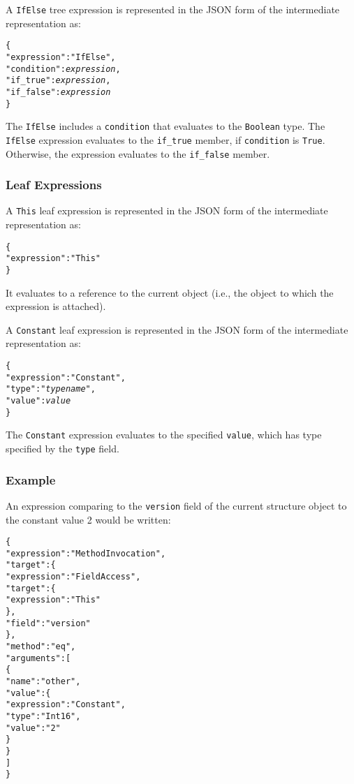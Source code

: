 \documentclass[10pt,twocolumn,a4paper]{article}
\newcommand{\code}[1]{\texttt{#1}}
\begin{document}
A \code{IfElse} tree expression is represented in the JSON form of the
intermediate representation as:
\footnotesize
\begin{alltt}
  \{
    "expression"  : "IfElse",
    "condition"   : \emph{expression},
    "if\_true"     : \emph{expression},
    "if\_false"    : \emph{expression}
  \}
\end{alltt}
\normalsize
The \code{IfElse} includes a \code{condition} that evaluates to the \code{Boolean} type.
The \code{IfElse} expression evaluates to the \code{if\_true} member, if \code{condition}
is \code{True}. Otherwise, the expression evaluates to the \code{if\_false} member.

\subsubsection{Leaf Expressions}

A \code{This} leaf expression is represented in the JSON form of the
intermediate representation as:
\footnotesize
\begin{alltt}
  \{
    "expression"   : "This"
  \}
\end{alltt}
\normalsize
It evaluates to a reference to the current object (i.e., the object to
which the expression is attached).

A \code{Constant} leaf expression is represented in the JSON form of the
intermediate representation as:
\footnotesize
\begin{alltt}
  \{
    "expression"   : "Constant",
    "type"         : "\emph{type name}",
    "value"        : \emph{value}
  \}
\end{alltt}
\normalsize
The \code{Constant} expression evaluates to the specified \code{value},
which has type specified by the \code{type} field.

\subsubsection{Example}

An expression comparing to the \code{version} field of the current
structure object to the constant value 2 would be written:
\footnotesize
\begin{alltt}
  \{
     "expression" : "MethodInvocation",
     "target"     : \{
       "expression" : "FieldAccess",
       "target" : \{
         "expression" : "This"
       \},
       "field"    : "version"
     \},
     "method"     : "eq",
     "arguments"  : [
       \{
         "name"  : "other",
         "value" : \{
           "expression" : "Constant",
           "type"       : "Int16",
           "value"      : "2"
         \}
       \}
     ]
  \}
\end{alltt}
\normalsize
\end{document}
